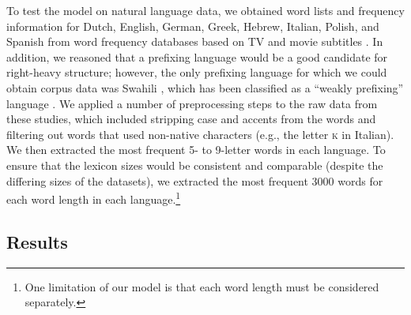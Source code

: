 \documentclass[doc,biblatex]{apa7}
\begin{document}
To test the model on natural language data, we obtained word lists and frequency information for Dutch, English, German, Greek, Hebrew, Italian, Polish, and Spanish from word frequency databases based on TV and movie subtitles \parencite{Brysbaert:2009, Brysbaert:2011, Crepaldi:2015, Cuetos:2011, Dimitropoulou:2010, Keuleers:2010, Mandera:2014, VanParidon:2021}. In addition, we reasoned that a prefixing language would be a good candidate for right-heavy structure; however, the only prefixing language for which we could obtain corpus data was Swahili \parencite{Hurskainen:2016}, which has been classified as a ``weakly prefixing'' language \parencite{wals-26}. We applied a number of preprocessing steps to the raw data from these studies, which included stripping case and accents from the words and filtering out words that used non-native characters (e.g., the letter \textsc{k} in Italian). We then extracted the most frequent 5- to 9-letter words in each language. To ensure that the lexicon sizes would be consistent and comparable (despite the differing sizes of the datasets), we extracted the most frequent 3000 words for each word length in each language.\footnote{One limitation of our model is that each word length must be considered separately.}

\subsection{Results}
\end{document}
